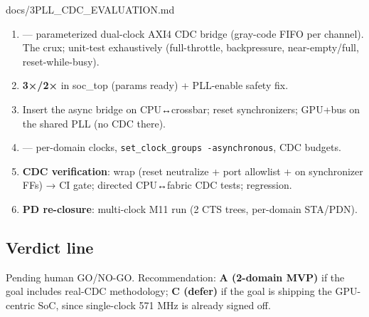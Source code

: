 \begin{relocated}{docs/3PLL_CDC_EVALUATION.md}
\begin{enumerate}
\def\labelenumi{\arabic{enumi}.}
\tightlist
\item
  \textbf{} --- parameterized dual-clock AXI4
  CDC bridge (gray-code FIFO per channel). The crux; unit-test
  exhaustively (full-throttle, backpressure,
  near-empty/\allowbreak{}full, reset-while-busy).
\item
  \textbf{3×/2× } in soc\_top (params ready) +
   PLL-enable safety fix.
\item
  Insert the async bridge on CPU↔crossbar; reset synchronizers; GPU+bus
  on the shared PLL (no CDC there).
\item
  \textbf{} --- per-domain clocks,
  \texttt{set\_\allowbreak{}clock\_\allowbreak{}groups\ -\allowbreak{}asynchronous},
   CDC budgets.
\item
  \textbf{CDC verification}: wrap  (reset neutralize +
  port allowlist +  on synchronizer FFs) → 
  CI gate; directed CPU↔fabric CDC tests;  regression.
\item
  \textbf{PD re-closure}: multi-clock M11 run (2 CTS trees, per-domain
  STA/PDN).
\end{enumerate}

\subsection{Verdict line}\label{tm:dec:3pll-cdc:7-verdict-line}

Pending human GO/NO-GO. Recommendation: \textbf{A (2-domain MVP)} if the
goal includes real-CDC methodology; \textbf{C (defer)} if the goal is
shipping the GPU-centric SoC, since single-clock 571 MHz is already
signed off.
\end{relocated}

